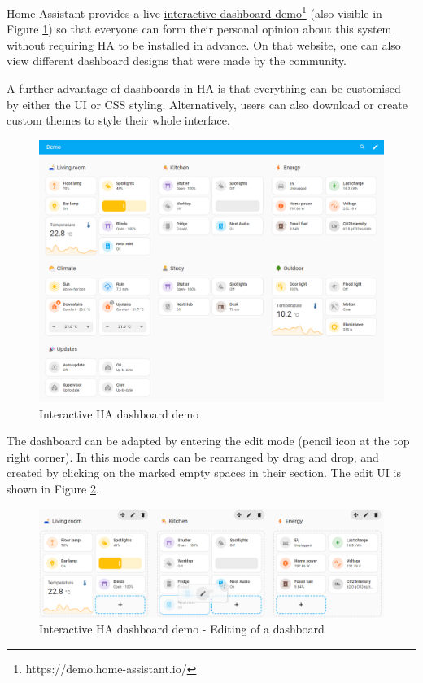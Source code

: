 Home Assistant provides a live \href{https://demo.home-assistant.io/}{interactive dashboard demo}\footnote{https://demo.home-assistant.io/} (also visible in Figure \ref{fig:HA-Dashboard-Demo}) so that everyone can form their personal opinion about this system without requiring HA to be installed in advance. On that website, one can also view different dashboard designs that were made by the community.

A further advantage of dashboards in HA is that everything can be customised by either the UI or CSS styling. Alternatively, users can also download or create custom themes \cite{HomeAssistant_Frontend} to style their whole interface.

\begin{figure}[H]
    \centering
    \includegraphics[width=.95\linewidth]{img/ha-dashboard-demo.png}
    \caption{Interactive HA dashboard demo \cite{HomeAssistant_Dashboard_Demo}}
    \label{fig:HA-Dashboard-Demo}
\end{figure}

The dashboard can be adapted by entering the edit mode (pencil icon at the top right corner). In this mode cards can be rearranged by drag and drop, and created by clicking on the marked empty spaces in their section. The edit UI is shown in Figure \ref{fig:HA-Dashboard-Demo-Editing}.

\begin{figure}[H]
    \centering
    \includegraphics[width=.95\linewidth]{img/ha-dashboard-demo-editing.png}
    \caption{Interactive HA dashboard demo - Editing of a dashboard \cite{HomeAssistant_Dashboard_Demo}}
    \label{fig:HA-Dashboard-Demo-Editing}
\end{figure}

